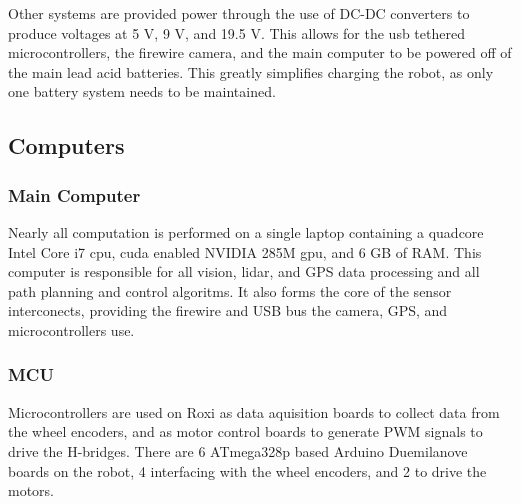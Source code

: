 Other systems are provided power through the use of DC-DC converters to produce voltages at 5 V, 9 V, and 19.5 V. This allows for the usb tethered microcontrollers, the firewire camera, and the main computer to be powered off of the main lead acid batteries. This greatly simplifies charging the robot, as only one battery system needs to be maintained.

\subsection{Computers}

\subsubsection{Main Computer}

Nearly all computation is performed on a single laptop containing a quadcore Intel Core i7 cpu, cuda enabled NVIDIA 285M gpu, and 6 GB of RAM. This computer is responsible for all vision, lidar, and GPS data processing and all path planning and control algoritms. It also forms the core of the sensor interconects, providing the firewire and USB bus the camera, GPS, and microcontrollers use.

\subsubsection{MCU}

Microcontrollers are used on Roxi as data aquisition boards to collect data from the wheel encoders, and as motor control boards to generate PWM signals to drive the H-bridges. There are 6 ATmega328p based Arduino Duemilanove boards on the robot, 4 interfacing with the wheel encoders, and 2 to drive the motors.
